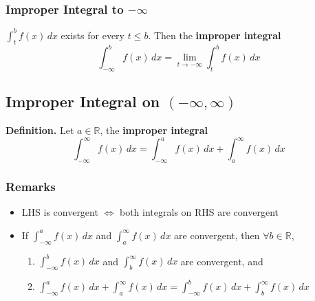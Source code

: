 \documentclass[../ma2002_notes.tex]{subfiles}
\begin{document}
\subsubsection{Improper Integral to $-\infty$}
\(\int_t^bf(x)\,dx\) exists for every \(t\leq b\). Then the \textbf{improper integral}
\[\int_{-\infty}^b f(x)\,dx=\lim\limits_{t\to-\infty}\int_t^bf(x)\,dx\]

\subsection{Improper Integral on $(-\infty,\infty)$}
\textbf{Definition.} Let \(a\in\mathbb{R}\), the \textbf{improper integral}
\[\int_{-\infty}^\infty f(x)\,dx=\int_{-\infty}^af(x)\,dx+\int_a^\infty f(x)\,dx\]

\subsubsection{Remarks}
\begin{itemize}
	\item LHS is convergent \(\iff\) both integrals on RHS are convergent
	\item If \(\int_{-\infty}^af(x)\,dx\) and \(\int_a^\infty f(x)\,dx\) are convergent, then \(\forall b\in\mathbb{R}\),
	\begin{enumerate}
		\item\(\int_{-\infty}^bf(x)\,dx\) and \(\int_b^\infty f(x)\,dx\) are convergent, and
		\item\(\int_{-\infty}^af(x)\,dx+\int_a^\infty f(x)\,dx=\int_{-\infty}^bf(x)\,dx+\int_b^\infty f(x)\,dx\)
	\end{enumerate}
\end{itemize}
\end{document}
